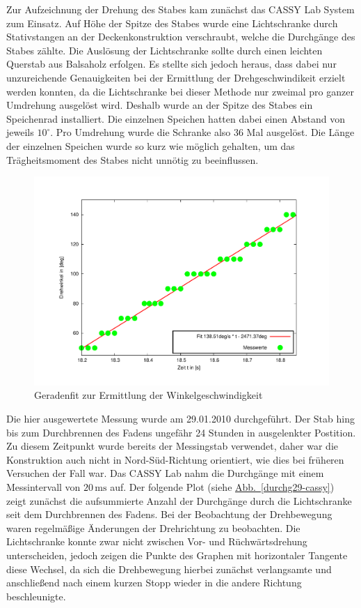\documentclass[halfparskip, 11pt]{scrartcl}
\newcommand{\unit}[1]{\ensuremath{\,\mathrm{#1}}} %
\newcommand{\hypref}[2]{\hyperref[#2]{{#1}~\ref{#2}}}
\begin{document}
Zur Aufzeichnung der Drehung des Stabes kam zun\"achst das CASSY Lab System zum Einsatz. Auf H\"ohe der Spitze des Stabes wurde eine Lichtschranke durch Stativstangen an der Deckenkonstruktion verschraubt, welche die Durchg\"ange des Stabes z\"ahlte. Die Ausl\"osung der Lichtschranke sollte durch einen leichten Querstab aus Balsaholz erfolgen. Es stellte sich jedoch heraus, dass dabei nur unzureichende Genauigkeiten bei der Ermittlung der Drehgeschwindikeit erzielt werden konnten, da die Lichtschranke bei dieser Methode nur zweimal pro ganzer Umdrehung ausgel\"ost wird. Deshalb wurde an der Spitze des Stabes ein \glqq Speichenrad\grqq{} installiert. Die einzelnen Speichen hatten dabei einen Abstand von jeweils $10^\circ$. Pro Umdrehung wurde die Schranke also 36 Mal ausgel\"ost. Die L\"ange der einzelnen Speichen wurde so kurz wie m\"oglich gehalten, um das Tr\"agheitsmoment des Stabes nicht unn\"otig zu beeinflussen.
\begin{figure}[ht]
\centering
\includegraphics[width=1.\textwidth]{zeit-winkel29-cassy.pdf}
\vspace{-2\baselineskip}
\caption{Geradenfit zur Ermittlung der Winkelgeschwindigkeit}
\label{zeit-winkel29-cassy}
\end{figure}

Die hier ausgewertete Messung wurde am 29.01.2010 durchgef\"uhrt. Der Stab hing bis zum Durchbrennen des Fadens ungef\"ahr 24 Stunden in ausgelenkter Postition. Zu diesem Zeitpunkt wurde bereits der Messingstab verwendet, daher war die Konstruktion auch nicht in Nord-S\"ud-Richtung orientiert, wie dies bei fr\"uheren Versuchen der Fall war. Das CASSY Lab nahm die Durchg\"ange mit einem Messintervall von $20\unit{ms}$ auf. Der folgende Plot (siehe \hypref{Abb.}{durchg29-cassy}) zeigt zun\"achst die aufsummierte Anzahl der Durchg\"ange durch die Lichtschranke seit dem Durchbrennen des Fadens. Bei der Beobachtung der Drehbewegung waren regelm\"a\ss{}ige \"Anderungen der Drehrichtung zu beobachten. Die Lichtschranke konnte zwar nicht zwischen Vor- und R\"uchw\"artsdrehung unterscheiden, jedoch zeigen die Punkte des Graphen mit horizontaler Tangente diese Wechsel, da sich die Drehbewegung hierbei zun\"achst verlangsamte und anschlie\ss{}end nach einem kurzen Stopp wieder in die andere Richtung beschleunigte.
\end{document}
